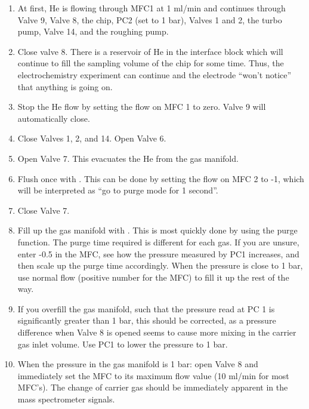\begin{enumerate}
	\item At first, He is flowing through MFC1 at 1 ml/min and continues through Valve 9, Valve 8, the chip, PC2 (set to 1 bar), Valves 1 and 2, the turbo pump, Valve 14, and the roughing pump.
	
	\item Close valve 8. There is a reservoir of He in the interface block which will continue to fill the sampling volume of the chip for some time. Thus, the electrochemistry experiment can continue and the electrode ``won't notice'' that anything is going on.
	
	\item Stop the He flow by setting the flow on MFC 1 to zero. Valve 9 will automatically close.
	
	\item Close Valves 1, 2, and 14. Open Valve 6.
	
	\item Open Valve 7. This evacuates the He from the gas manifold. 
	
	\item Flush once with . This can be done by setting the flow on MFC 2 to -1, which will be interpreted as ``go to purge mode for 1 second''.
	
	\item Close Valve 7. 
	
	\item Fill up the gas manifold with . This is most quickly done by using the purge function. The purge time required is different for each gas. If you are unsure, enter -0.5 in the MFC, see how the pressure measured by PC1 increases, and then scale up the purge time accordingly. When the pressure is close to 1 bar, use normal flow (positive number for the MFC) to fill it up the rest of the way.
	
	\item If you overfill the gas manifold, such that the pressure read at PC 1 is significantly greater than 1 bar, this should be corrected, as a pressure difference when Valve 8 is opened seems to cause more mixing in the carrier gas inlet volume. Use PC1 to lower the pressure to 1 bar.
	
	\item When the pressure in the gas manifold is 1 bar: open Valve 8 and immediately set the MFC to its maximum flow value (10 ml/min for most MFC's). The change of carrier gas should be immediately apparent in the mass spectrometer signals.
	

\end{enumerate}
